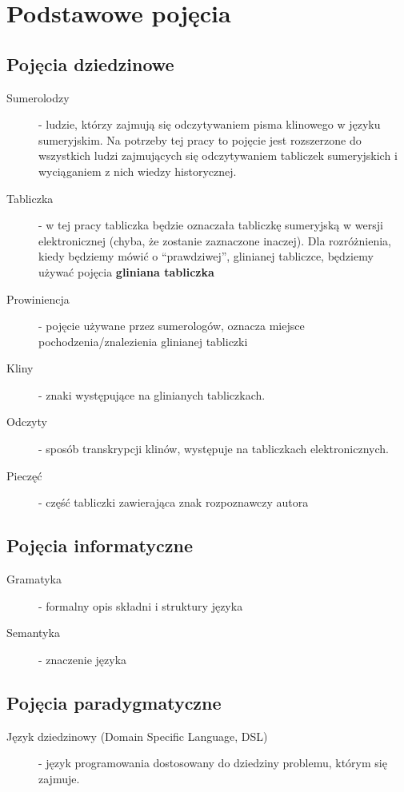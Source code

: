 \chapter{Podstawowe pojęcia}\label{r:pojecia}
\section{Pojęcia dziedzinowe}
\begin{description}
 \item[Sumerolodzy] - ludzie, którzy zajmują się odczytywaniem pisma klinowego w języku sumeryjskim. Na potrzeby tej pracy
		      to pojęcie jest rozszerzone do wszystkich ludzi zajmujących się odczytywaniem tabliczek sumeryjskich 
		      i wyciąganiem z nich wiedzy historycznej.
 \item[Tabliczka] - w tej pracy tabliczka będzie oznaczała tabliczkę sumeryjską w wersji elektronicznej 
		  (chyba, że zostanie zaznaczone inaczej). Dla rozróżnienia, kiedy będziemy mówić o ``prawdziwej'', 
		  glinianej tabliczce, będziemy używać pojęcia \textbf{gliniana tabliczka}
 \item[Prowiniencja] - pojęcie używane przez sumerologów, oznacza miejsce pochodzenia/znalezienia glinianej tabliczki
 \item[Kliny] - znaki występujące na glinianych tabliczkach.
 \item[Odczyty] - sposób transkrypcji klinów, występuje na tabliczkach elektronicznych.
 \item[Pieczęć] - część tabliczki zawierająca znak rozpoznawczy autora
\end{description}

\section{Pojęcia informatyczne}
\begin{description}
 \item[Gramatyka] - formalny opis składni i struktury języka
 \item[Semantyka] - znaczenie języka
 \end{description}
\section{Pojęcia paradygmatyczne}
\begin{description}
 \item[Język dziedzinowy (Domain Specific Language, DSL)] - język programowania dostosowany do dziedziny problemu, którym się zajmuje. 
 \end{description}